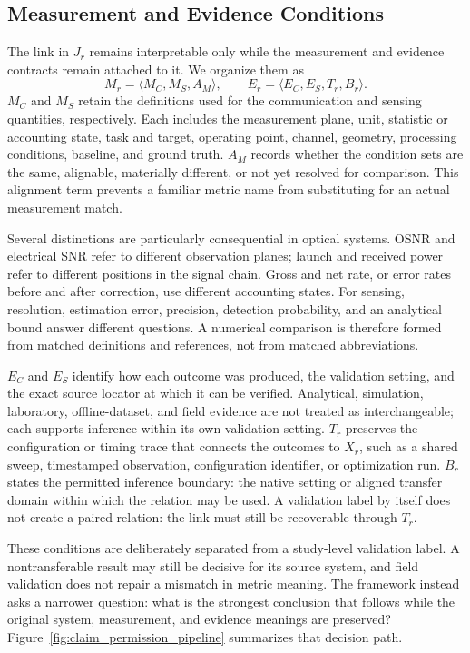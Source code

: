 \subsection{Measurement and Evidence Conditions}

The link in $J_r$ remains interpretable only while the measurement and
evidence contracts remain attached to it. We organize them as
\[
M_r=\langle M_C,M_S,A_M\rangle,
\qquad
E_r=\langle E_C,E_S,T_r,B_r\rangle .
\]
$M_C$ and $M_S$ retain the definitions used for the communication and
sensing quantities, respectively. Each includes the measurement plane, unit,
statistic or accounting state, task and target, operating point, channel,
geometry, processing conditions, baseline, and ground truth. $A_M$ records
whether the condition sets are the same, alignable, materially different, or
not yet resolved for comparison. This
alignment term prevents a familiar metric name from substituting for an
actual measurement match.

Several distinctions are particularly consequential in optical systems. OSNR
and electrical SNR refer to different observation planes; launch and received
power refer to different positions in the signal chain. Gross and net rate,
or error rates before and after correction, use different accounting states.
For sensing, resolution, estimation error, precision, detection probability,
and an analytical bound answer different questions. A numerical comparison is
therefore formed from matched definitions and references, not from matched
abbreviations.

$E_C$ and $E_S$ identify how each outcome was produced, the validation setting,
and the exact source locator at which it can be verified. Analytical,
simulation, laboratory, offline-dataset, and field evidence are not treated as
interchangeable; each supports inference within its own validation setting.
$T_r$ preserves the configuration or timing trace that connects the outcomes
to $X_r$, such as a shared sweep, timestamped observation, configuration
identifier, or optimization run. $B_r$ states the permitted inference boundary:
the native setting or aligned transfer domain within which the relation may be
used. A validation label by itself does not create a paired relation: the link
must still be recoverable through $T_r$.

These conditions are deliberately separated from a study-level validation
label. A nontransferable result may still be decisive for its source system,
and field validation does not repair a mismatch in metric meaning. The
framework instead asks a narrower question: what is the strongest conclusion
that follows while the original system, measurement, and evidence meanings
are preserved? Figure~\ref{fig:claim_permission_pipeline} summarizes that
decision path.

